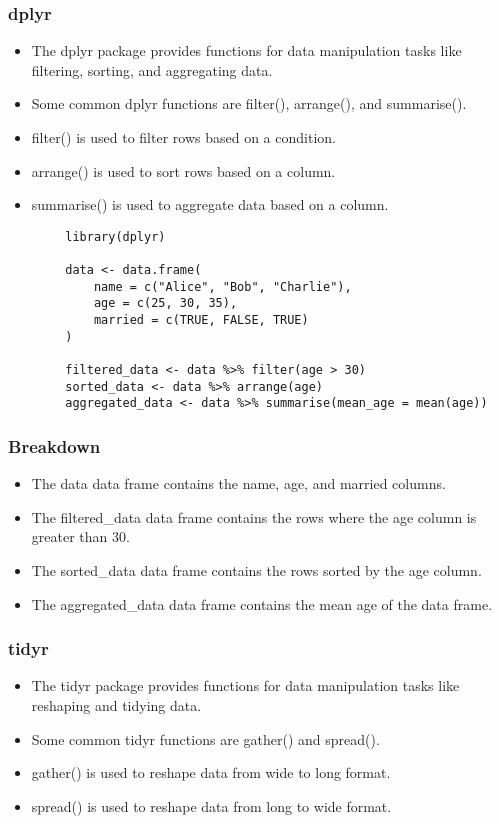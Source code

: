 \documentclass[serif, 9pt, aspectratio=32]{beamer}
\begin{document}
\begin{frame}
    \centering
    \frametitle{dplyr}
    \begin{itemize}
        \setlength{\itemsep}{2em}
        \item The dplyr package provides functions for data manipulation tasks like filtering, sorting, and aggregating data.
        \item Some common dplyr functions are filter(), arrange(), and summarise().
        \item filter() is used to filter rows based on a condition.
        \item arrange() is used to sort rows based on a column.
        \item summarise() is used to aggregate data based on a column.
    \end{itemize}
\end{frame}

\begin{frame}[fragile]
    \begin{lstlisting}
        library(dplyr)

        data <- data.frame(
            name = c("Alice", "Bob", "Charlie"),
            age = c(25, 30, 35),
            married = c(TRUE, FALSE, TRUE)
        )

        filtered_data <- data %>% filter(age > 30)
        sorted_data <- data %>% arrange(age)
        aggregated_data <- data %>% summarise(mean_age = mean(age))
    \end{lstlisting}
\end{frame}

\begin{frame}
    \centering
    \frametitle{Breakdown}
    \begin{itemize}
        \setlength{\itemsep}{2em}
        \item The data data frame contains the name, age, and married columns.
        \item The filtered\_data data frame contains the rows where the age column is greater than 30.
        \item The sorted\_data data frame contains the rows sorted by the age column.
        \item The aggregated\_data data frame contains the mean age of the data frame.
    \end{itemize}
\end{frame}

\begin{frame}
    \centering
    \frametitle{tidyr}
    \begin{itemize}
        \setlength{\itemsep}{2em}
        \item The tidyr package provides functions for data manipulation tasks like reshaping and tidying data.
        \item Some common tidyr functions are gather() and spread().
        \item gather() is used to reshape data from wide to long format.
        \item spread() is used to reshape data from long to wide format.
    \end{itemize}
\end{frame}
\end{document}
